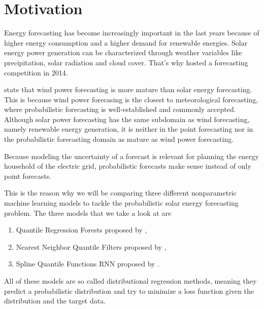 \section{Motivation}
\label{sec:motivation}

Energy forecasting has become increasingly important in the last years 
because of higher energy consumption and a higher demand for renewable energies. 
Solar energy power generation can be characterized through weather variables like 
precipitation, solar radiation and cloud cover. 
That's why \Textcite{Hong2016} hosted a forecasting competition in 2014. 

\Textcite{Hong2016} state that wind power forecasting is 
more mature than solar energy forecasting. This is because 
wind power forecasing is the closest to meteorological forecasting, 
where probabilistic forecasting is well-established and commonly accepted.
Although solar power forecasting has the same subdomain as wind forecasting, 
namely renewable energy generation, it is neither in the 
point forecasting nor in the probabilistic forecasting domain as mature 
as wind power forecasting. 

Because modeling the uncertainty of a forecast is relevant for planning 
the energy household of the electric grid, probabilistic forecasts 
make sense instead of only point forecasts. 

This is the reason why we will be comparing three different nonparametric 
machine learning models to tackle the probabilistic solar energy forecasting 
problem. 
The three models that we take a look at are 
\begin{enumerate}
    \item Quantile Regression Forests proposed by \Textcite{Meinshausen2006},
    \item Nearest Neighbor Quantile Filters proposed by \Textcite{Ordiano2019},
    \item Spline Quantile Functions RNN proposed by \Textcite{Gasthaus2019}.
\end{enumerate}
All of these models are so called distributional regression methods, meaning 
they predict a probabilistic distribution and try to minimize a loss function 
given the distribution and the target data.